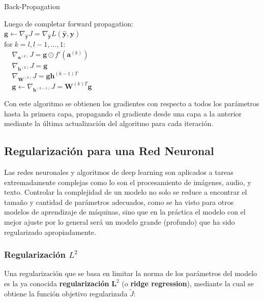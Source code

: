 \begin{algorithm}[H] %
\caption{Back-Propagation}\label{ML:Algorithm2}
Luego de completar forward propagation: \\
$\bm{g} \leftarrow \nabla_{\bm{\hat{y}}} J = \nabla_{\bm{\hat{y}}} L(\bm{\hat{y}},\bm{y})$\\
$\textrm{for} \;k = l,l-1,...,1:$\\
$\;\;\;\;\nabla_{\bm{a}^{(k)}} J = \bm{g}\odot f'(\bm{a}^{(k)})$\\
$\;\;\;\;\nabla_{\bm{b}^{(k)}} J = \bm{g}$\\
$\;\;\;\;\nabla_{\bm{W}^{(k)}} J = \bm{g}\bm{h}^{(k-1)T}$\\
$\;\;\;\;\bm{g} \leftarrow \nabla_{\bm{h}^{(k-1)}} J = \bm{W}^{(k)T}\bm{g}$
\end{algorithm}

Con este algoritmo se obtienen los gradientes con respecto a todos los par\'ametros hasta la primera capa, propagando el gradiente desde una capa a la anterior mediante la \'ultima actualizaci\'on del algoritmo para cada iteraci\'on.

\subsection{Regularizaci\'on para una Red Neuronal}

Las redes neuronales y algoritmos de deep learning son aplicados a tareas extremadamente complejas como lo son el procesamiento de im\'agenes, audio, y texto. Controlar la complejidad de un modelo no solo se reduce a encontrar el tamaño y cantidad de parámetros adecuados, como se ha visto para otros modelos de aprendizaje de m\'aquinas, sino que en la pr\'actica el modelo con el mejor ajuste por lo general ser\'a un modelo grande (profundo) que ha sido regularizado apropiadamente.%

\subsubsection{Regularización ${L}^{2}$}

Una regularizaci\'on que se basa en limitar la norma de los parámetros del modelo es la ya conocida \textbf{regularizaci\'on} $\bm{L}^{2}$ (o \textbf{ridge regression}), mediante la cual se obtiene la funci\'on objetivo regularizada $\tilde{J}$:

